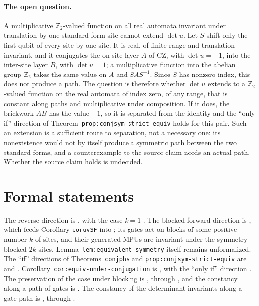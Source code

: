 \documentclass{article}
\begin{document}
\paragraph{The open question.} A multiplicative $\mathbb Z_2$-valued function on
all real automata invariant under translation by one standard-form site cannot
extend $\det u$. Let $S$ shift only the first qubit of every site by one site.
It is real, of finite range and translation invariant, and it conjugates the
on-site layer $A$ of $\mathrm{CZ}$, with $\det u=-1$, into the inter-site layer
$B$, with $\det u=1$; a multiplicative function into the abelian group
$\mathbb Z_2$ takes the same value on $A$ and $SAS^{-1}$. Since $S$ has nonzero
index, this does not produce a path. The question is therefore whether
$\det u$ extends to a $\mathbb Z_2$-valued function on the real automata of
index zero, of any range, that is constant along paths and multiplicative under
composition. If it does, the brickwork $AB$ has the value $-1$, so it is
separated from the identity and the ``only if'' direction of
Theorem~\texttt{prop:conjsym-strict-equiv} holds for this pair. Such an
extension is a sufficient route to separation, not a necessary one: its
nonexistence would not by itself produce a symmetric path between the two
standard forms, and a counterexample to the source claim needs an actual path.
Whether the source claim holds is undecided.

\section{Formal statements}

The reverse direction is
,
with the case $k=1$
.
The blocked forward direction is
, which
feeds Corollary \texttt{coruvSF} into
; its gates act on blocks of some
positive number $k$ of sites, and their generated MPUs are invariant under
the symmetry blocked $2k$ sites. Lemma~\texttt{lem:equivalent-symmetry} itself remains unformalized.
The ``if'' directions of Theorems~\texttt{conjphs} and
\texttt{prop:conjsym-strict-equiv} are
 and
.
Corollary~\texttt{cor:equiv-under-conjugation} is
, with the
``only if'' direction
. The
preservation of the case under blocking is
, through
, and the
constancy along a path of gates is
. The constancy of the
determinant invariants along a gate path is
, through
.



\end{document}
